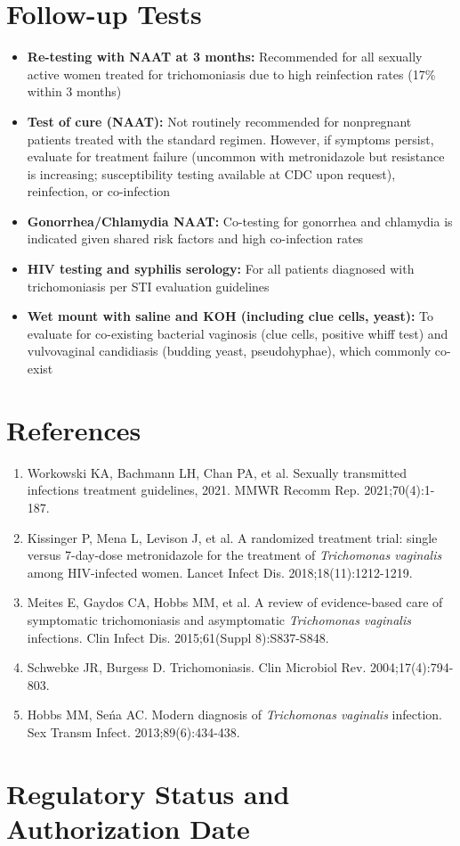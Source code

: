 \section*{Follow-up Tests}
\begin{itemize}
  \item \textbf{Re-testing with NAAT at 3 months:} Recommended for all sexually active women treated for trichomoniasis due to high reinfection rates (17\% within 3 months)
  \item \textbf{Test of cure (NAAT):} Not routinely recommended for nonpregnant patients treated with the standard regimen. However, if symptoms persist, evaluate for treatment failure (uncommon with metronidazole but resistance is increasing; susceptibility testing available at CDC upon request), reinfection, or co-infection
  \item \textbf{Gonorrhea/Chlamydia NAAT:} Co-testing for gonorrhea and chlamydia is indicated given shared risk factors and high co-infection rates
  \item \textbf{HIV testing and syphilis serology:} For all patients diagnosed with trichomoniasis per STI evaluation guidelines
  \item \textbf{Wet mount with saline and KOH (including clue cells, yeast):} To evaluate for co-existing bacterial vaginosis (clue cells, positive whiff test) and vulvovaginal candidiasis (budding yeast, pseudohyphae), which commonly co-exist
\end{itemize}

\section*{References}
\begin{enumerate}
  \item Workowski KA, Bachmann LH, Chan PA, et al. Sexually transmitted infections treatment guidelines, 2021. MMWR Recomm Rep. 2021;70(4):1-187.
  \item Kissinger P, Mena L, Levison J, et al. A randomized treatment trial: single versus 7-day-dose metronidazole for the treatment of \textit{Trichomonas vaginalis} among HIV-infected women. Lancet Infect Dis. 2018;18(11):1212-1219.
  \item Meites E, Gaydos CA, Hobbs MM, et al. A review of evidence-based care of symptomatic trichomoniasis and asymptomatic \textit{Trichomonas vaginalis} infections. Clin Infect Dis. 2015;61(Suppl 8):S837-S848.
  \item Schwebke JR, Burgess D. Trichomoniasis. Clin Microbiol Rev. 2004;17(4):794-803.
  \item Hobbs MM, Se\'na AC. Modern diagnosis of \textit{Trichomonas vaginalis} infection. Sex Transm Infect. 2013;89(6):434-438.
\end{enumerate}

\clearpage
\section*{Regulatory Status and Authorization Date}

\clearpage
